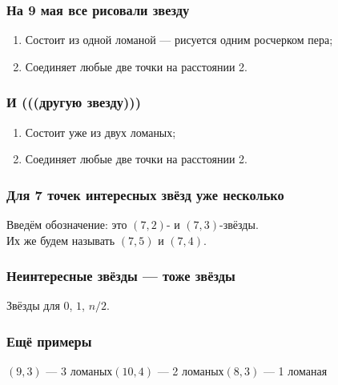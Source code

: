 \begin{frame} \frametitle{На 9 мая все рисовали звезду}
     \begin{center}  \end{center}
     \pause
     \begin{enumerate}
	\item Состоит из одной ломаной — рисуется одним росчерком пера;
	\item Соединяет любые две точки на расстоянии 2.
     \end{enumerate}
\end{frame}

\begin{frame} \frametitle{И (((другую звезду)))}
     \begin{center}  \end{center}
     \begin{enumerate}
	\item Состоит уже из двух ломаных;
	\item Соединяет любые две точки на расстоянии 2.
     \end{enumerate}
\end{frame}

\begin{frame} \frametitle{Для 7 точек интересных звёзд уже несколько}
     \begin{center}  \end{center}
     \pause
     Введём обозначение: это $(7,2)$- и $(7,3)$-звёзды.\\ Их же будем называть $(7,5)$ и $(7,4)$.
\end{frame}

\begin{frame} \frametitle{Неинтересные звёзды — тоже звёзды}
     \begin{center}  \end{center}
     \begin{center} Звёзды для $0$, $1$, $n / 2$. \end{center}
\end{frame}

\begin{frame} \frametitle{Ещё примеры}
     \begin{center}  \end{center}
     \begin{center}$(9,3)$ — 3 ломаных\qquad $(10,4)$ — 2 ломаных\qquad $(8,3)$ — 1 ломаная\end{center}
\end{frame}

